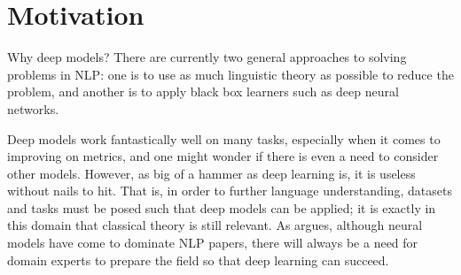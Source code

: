 \documentclass[12pt]{report}
\begin{document}
%
%
%
%
%
%




\section{Motivation}


Why deep models? There are currently two general approaches to solving problems in NLP: one is to use as much linguistic theory as possible to reduce the problem, and another is to apply black box learners such as deep neural networks.

Deep models work fantastically well on many tasks, especially when it comes to improving on metrics, and one might wonder if there is even a need to consider other models. However, as big of a hammer as deep learning is, it is useless without nails to hit.
That is, in order to further language understanding, datasets and tasks must be posed such that deep models can be applied; it is exactly in this domain that classical theory is still relevant.
As \citet{Manning2016} argues, although neural models have come to dominate NLP papers, there will always be a need for domain experts to prepare the field so that deep learning can succeed.

\end{document}
